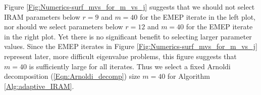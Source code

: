 Figure \ref{Fig:Numerics-surf_mvs_for_m_vs_j} suggests that we should not select IRAM parameters below $r = 9$ and $m = 40$ for the EMEP iterate in the left plot, nor should we select parameters below $r = 12$ and $m = 40$ for the EMEP iterate in the right plot.  
Yet there is no significant benefit to selecting larger parameter values.
Since the EMEP iterates in Figure \ref{Fig:Numerics-surf_mvs_for_m_vs_j} represent later, more difficult eigenvalue problems, this figure suggests that $m = 40$ is sufficiently large for all iterates.
Thus we select a fixed Arnoldi decomposition (\ref{Eqn:Arnoldi_decomp}) size $m = 40$ for Algorithm \ref{Alg:adaptive_IRAM}.











